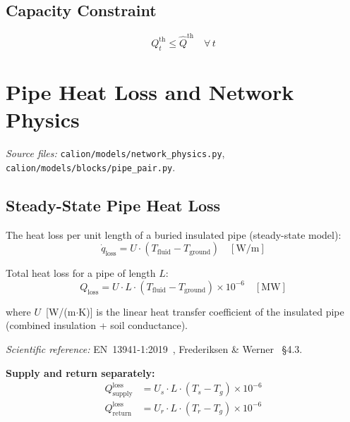 \documentclass[a4paper,12pt]{article}
\begin{document}
\subsection{Capacity Constraint}

\begin{equation}
  Q^{\text{th}}_{t} \leq \hat{Q}^{\text{th}}
  \quad \forall\, t
  \tag{GEN-4}
  \label{eq:gen4}
\end{equation}

\section{Pipe Heat Loss and Network Physics}
\label{sec:pipe}

\textit{Source files:} \texttt{calion/models/network\_physics.py},
\texttt{calion/models/blocks/pipe\_pair.py}.

\subsection{Steady-State Pipe Heat Loss}

The heat loss per unit length of a buried insulated pipe (steady-state model):
\[
  \dot{q}_{\text{loss}} = U \cdot (T_{\text{fluid}} - T_{\text{ground}}) \quad [\text{W/m}]
\]

Total heat loss for a pipe of length $L$:
\begin{equation}
  Q_{\text{loss}}
  = U \cdot L \cdot (T_{\text{fluid}} - T_{\text{ground}}) \times 10^{-6}
  \quad [\text{MW}]
  \tag{PH-1}
  \label{eq:ph1}
\end{equation}

where $U$~[W/(m$\cdot$K)] is the linear heat transfer coefficient of the insulated pipe
(combined insulation + soil conductance).

\noindent\textit{Scientific reference:} EN~13941-1:2019~\cite{EN13941}, Frederiksen \&
Werner~\cite{Frederiksen2013} \S4.3.

\noindent\textbf{Supply and return separately:}
\begin{align*}
  Q^{\text{loss}}_{\text{supply}}
    &= U_s \cdot L \cdot (T_s - T_g) \times 10^{-6} \\
  Q^{\text{loss}}_{\text{return}}
    &= U_r \cdot L \cdot (T_r - T_g) \times 10^{-6}
\end{align*}
\end{document}
